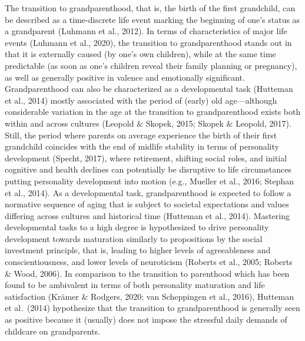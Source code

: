 \documentclass[
  english,
  man, noextraspace]{apa7}
\begin{document}
The transition to grandparenthood, that is, the birth of the first grandchild, can be described as a time-discrete life event marking the beginning of one's status as a grandparent (Luhmann et al., 2012). In terms of characteristics of major life events (Luhmann et al., 2020), the transition to grandparenthood stands out in that it is externally caused (by one's own children), while at the same time predictable (as soon as one's children reveal their family planning or pregnancy), as well as generally positive in valence and emotionally significant.\\
Grandparenthood can also be characterized as a developmental task (Hutteman et al., 2014) mostly associated with the period of (early) old age---although considerable variation in the age at the transition to grandparenthood exists both within and across cultures (Leopold \& Skopek, 2015; Skopek \& Leopold, 2017). Still, the period where parents on average experience the birth of their first grandchild coincides with the end of midlife stability in terms of personality development (Specht, 2017), where retirement, shifting social roles, and initial cognitive and health declines can potentially be disruptive to life circumstances putting personality development into motion (e.g., Mueller et al., 2016; Stephan et al., 2014). As a developmental task, grandparenthood is expected to follow a normative sequence of aging that is subject to societal expectations and values differing across cultures and historical time (Hutteman et al., 2014). Mastering developmental tasks to a high degree is hypothesized to drive personality development towards maturation similarly to propositions by the social investment principle, that is, leading to higher levels of agreeableness and conscientiousness, and lower levels of neuroticism (Roberts et al., 2005; Roberts \& Wood, 2006). In comparison to the transition to parenthood which has been found to be ambivalent in terms of both personality maturation and life satisfaction (Krämer \& Rodgers, 2020; van Scheppingen et al., 2016), Hutteman et al.~(2014) hypothesize that the transition to grandparenthood is generally seen as positive because it (usually) does not impose the stressful daily demands of childcare on grandparents.\\
\end{document}

